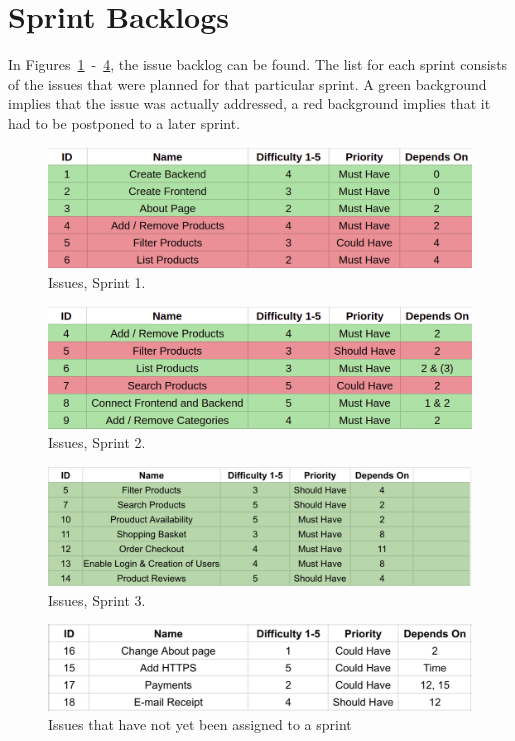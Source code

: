\newpage

\section{Sprint Backlogs}

In Figures~\ref{fig:sprint_1}~-~\ref{fig:sprint_4}, the issue backlog can
be found. The list for each sprint consists of the issues that were planned
for that particular sprint. A green background implies that the issue was
actually addressed, a red background implies that it had to be postponed to
a later sprint.

\begin{figure}[H]
\centering
\includegraphics[width=\textwidth]{third_sprint/sprint_1.png}
\caption{\label{fig:sprint_1} Issues, Sprint 1.}
\end{figure}

\begin{figure}[H]
\centering
\includegraphics[width=\textwidth]{third_sprint/sprint_2.png}
\caption{\label{fig:sprint_2} Issues, Sprint 2.}
\end{figure}

\begin{figure}[H]
\centering
\includegraphics[width=\textwidth]{third_sprint/sprint_3.2.png}
\caption{\label{fig:sprint_3} Issues, Sprint 3.}
\end{figure}

\begin{figure}[H]
\centering
\includegraphics[width=\textwidth]{third_sprint/other2.png}
\caption{\label{fig:sprint_4} Issues that have not yet been assigned to
a sprint}
\end{figure}
